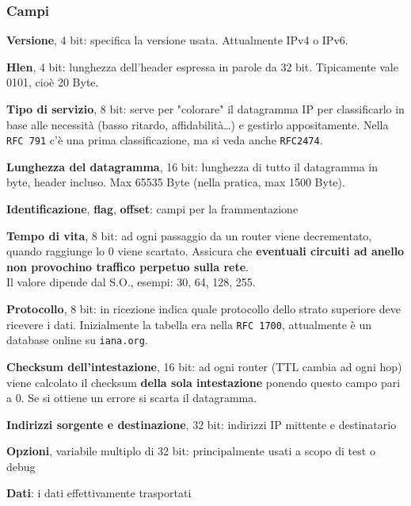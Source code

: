 \documentclass[10pt]{article}
\begin{document}
\subsubsection{Campi}
\begin{list}{}{}
\item \textbf{Versione}, 4 bit: specifica la versione usata. Attualmente IPv4 o IPv6.
\item \textbf{Hlen}, 4 bit: lunghezza dell'header espressa in parole da 32 bit. Tipicamente vale 0101, cioè 20 Byte.
\item \textbf{Tipo di servizio}, 8 bit: serve per "colorare" il datagramma IP per classificarlo in base alle necessità (basso ritardo, affidabilità\ldots) e gestirlo appositamente. Nella \texttt{RFC 791} c'è una prima classificazione, ma si veda anche \texttt{RFC2474}.
\item \textbf{Lunghezza del datagramma}, 16 bit: lunghezza di tutto il datagramma in byte, header incluso. Max 65535 Byte (nella pratica, max 1500 Byte).
\item \textbf{Identificazione}, \textbf{flag}, \textbf{offset}: campi per la frammentazione
\item \textbf{Tempo di vita}, 8 bit: ad ogni passaggio da un router viene decrementato, quando raggiunge lo 0 viene scartato. Assicura che \textbf{eventuali circuiti ad anello non provochino traffico perpetuo sulla rete}.\\
Il valore dipende dal S.O., esempi: 30, 64, 128, 255.
\item \textbf{Protocollo}, 8 bit: in ricezione indica quale protocollo dello strato superiore deve ricevere i dati. Inizialmente la tabella era nella \texttt{RFC 1700}, attualmente è un database online su \texttt{iana.org}.
\item \textbf{Checksum dell'intestazione}, 16 bit: ad ogni router (TTL cambia ad ogni hop) viene calcolato il checksum \textbf{della sola intestazione} ponendo questo campo pari a 0. Se si ottiene un errore si scarta il datagramma.
\item \textbf{Indirizzi sorgente e destinazione}, 32 bit: indirizzi IP mittente e destinatario
\item \textbf{Opzioni}, variabile multiplo di 32 bit: principalmente usati a scopo di test o debug
\item \textbf{Dati}: i dati effettivamente trasportati
\end{list}
\end{document}
